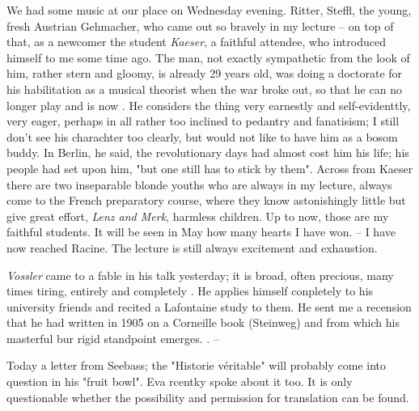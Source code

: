 
We had some music at our place on Wednesday evening. Ritter, Steffl, the young, fresh Austrian Gehmacher, who came out so bravely in my lecture -- on top of that, as a newcomer the student \textit{Kaeser}, a faithful attendee, who introduced himself to me some time ago. The man, not exactly sympathetic from the look of him, rather stern and gloomy, is already 29 years old, was doing a doctorate  for his habilitation as a musical theorist when the war broke out,  so that he can no longer play and is now . He considers the thing very earnestly and self-evidenttly, very eager, perhaps in all rather too inclined to pedantry and fanatisism; I still don't see his charachter too clearly, but would not like to have him as a bosom buddy. In Berlin, he said, the revolutionary days had almost cost him his life; his people had set upon him, "but one still has to stick by them". Across from Kaeser there are two inseparable blonde youths who are always in my lecture, always come to the French preparatory course, where they know astonishingly little but give great effort, \textit{Lenz and Merk}, harmless children. Up to now, those are my faithful students. It will be seen in May how many hearts I have won. -- I have now reached Racine. The lecture is still always excitement and exhaustion.

\textit{Vossler} came to a fable in his talk yesterday; it is broad, often precious, many times tiring, entirely and completely . He applies himself conpletely to his university friends and recited a Lafontaine study to them. He sent me a recension that he had written in 1905 on a Corneille book (Steinweg) and from which his masterful bur rigid standpoint emerges. . --

Today a letter from Seebass; the "Historie véritable" will probably come into question in his "fruit bowl". Eva rcentky spoke about it too. It is only questionable whether the possibility and permission for translation can be found.

